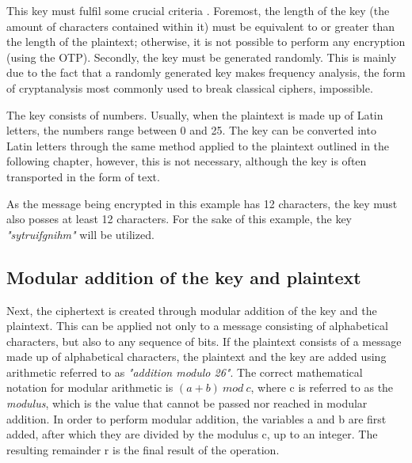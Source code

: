 \documentclass[12pt]{report}
\begin{document}
This key must fulfil some crucial criteria \cite{MilsElectronic}. Foremost, the length of the key (the amount of  characters contained within it) must be equivalent to or greater than the length of the plaintext; otherwise, it is not possible to perform any encryption (using the OTP). Secondly, the key must be generated randomly. This is mainly due to the fact that a randomly generated key makes frequency analysis\cite{FrequencyAnalysis}, the form of cryptanalysis most commonly used to break classical ciphers, impossible.


The key consists of numbers. Usually, when the plaintext is made up of Latin letters, the numbers range between 0 and 25. The key can be converted into Latin letters through the same method applied to the plaintext outlined in the following chapter, however, this is not necessary, although the key is often transported in the form of text.

As the message being encrypted in this example has 12 characters, the key must also posses at least 12 characters. For the sake of this example, the key \textit{"sytruifgnihm"} will be utilized.

\subsection{Modular addition of the key and plaintext}



Next, the ciphertext is created through modular addition of the key and the plaintext. This can be applied not only to a message consisting of alphabetical characters, but also to any sequence of bits. If the plaintext consists of a message made up of alphabetical characters, the plaintext and the key are added using arithmetic referred to as \textit{"addition modulo 26"}. The correct mathematical notation for modular arithmetic is $(a+b)\:mod\:c$, where c is referred to as the \textit{modulus}, which is the value that cannot be passed nor reached in modular addition. In order to perform modular addition, the variables a and b are first added, after which they are divided by the modulus c, up to an integer. The resulting remainder r is the final result of the operation.
\end{document}
